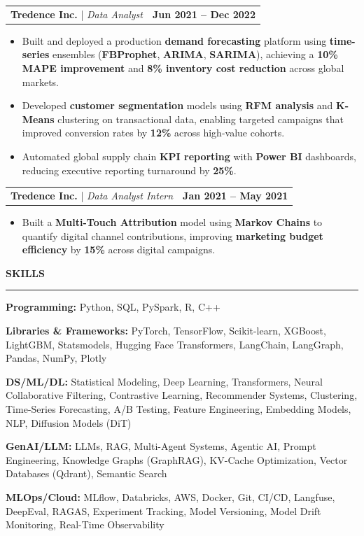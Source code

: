 \documentclass[10pt]{article}
\makeatletter
\newcommand{\resumesection}[1]{%
  \vspace{4pt}%
  {\bfseries\normalsize\MakeUppercase{#1}}\\[-2pt]
  \hrule
  \vspace{2pt}%
}
\newcommand{\twoCol}[2]{%
  \begin{tabular*}{\textwidth}{@{\extracolsep{\fill}} l r}
    #1 & #2 \\
  \end{tabular*}
}
\newcommand{\bulletListStart}{\begin{itemize}[leftmargin=0.15in, labelsep=0.08in, itemsep=0pt, topsep=1pt, parsep=0pt, partopsep=0pt]}
\newcommand{\bulletListEnd}{\end{itemize}}
\makeatother
\begin{document}
\vspace{2pt}
\twoCol{\textbf{Tredence Inc.} \;|\; \textit{Data Analyst}}{\textbf{Jun 2021 -- Dec 2022}}
\bulletListStart
  \item Built and deployed a production \textbf{demand forecasting} platform using \textbf{time-series} ensembles (\textbf{FBProphet}, \textbf{ARIMA}, \textbf{SARIMA}), achieving a \textbf{10\% MAPE improvement} and \textbf{8\% inventory cost reduction} across global markets.
  \item Developed \textbf{customer segmentation} models using \textbf{RFM analysis} and \textbf{K-Means} clustering on transactional data, enabling targeted campaigns that improved conversion rates by \textbf{12\%} across high-value cohorts.
  \item Automated global supply chain \textbf{KPI reporting} with \textbf{Power BI} dashboards, reducing executive reporting turnaround by \textbf{25\%}.
\bulletListEnd

\vspace{2pt}
\twoCol{\textbf{Tredence Inc.} \;|\; \textit{Data Analyst Intern}}{\textbf{Jan 2021 -- May 2021}}
\bulletListStart
  \item Built a \textbf{Multi-Touch Attribution} model using \textbf{Markov Chains} to quantify digital channel contributions, improving \textbf{marketing budget efficiency} by \textbf{15\%} across digital campaigns.
\bulletListEnd

\resumesection{Skills}

\textbf{Programming:} Python, SQL, PySpark, R, C++

\textbf{Libraries \& Frameworks:} PyTorch, TensorFlow, Scikit-learn, XGBoost, LightGBM, Statsmodels, Hugging Face Transformers, LangChain, LangGraph, Pandas, NumPy, Plotly

\textbf{DS/ML/DL:} Statistical Modeling, Deep Learning, Transformers, Neural Collaborative Filtering, Contrastive Learning, Recommender Systems, Clustering, Time-Series Forecasting, A/B Testing, Feature Engineering, Embedding Models, NLP, Diffusion Models (DiT)

\textbf{GenAI/LLM:} LLMs, RAG, Multi-Agent Systems, Agentic AI, Prompt Engineering, Knowledge Graphs (GraphRAG), KV-Cache Optimization, Vector Databases (Qdrant), Semantic Search

\textbf{MLOps/Cloud:} MLflow, Databricks, AWS, Docker, Git, CI/CD, Langfuse, DeepEval, RAGAS, Experiment Tracking, Model Versioning, Model Drift Monitoring, Real-Time Observability
\end{document}
